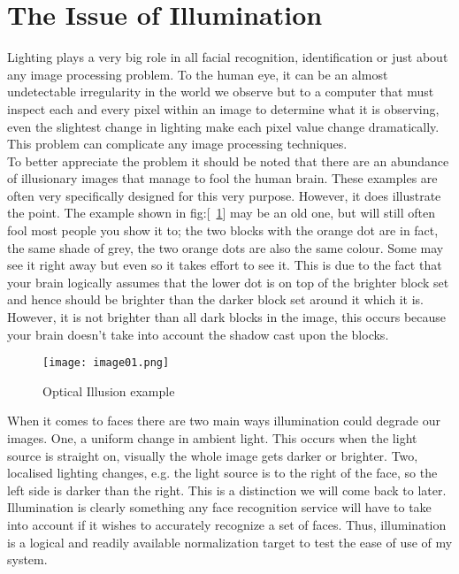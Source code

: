 \section{The Issue of Illumination}
Lighting plays a very big role in all facial recognition, identification or just about any image processing problem.  
To the human eye, it can be an almost undetectable irregularity in the world we observe but to a computer that must 
inspect each and every pixel within an image to determine what it is observing, even the slightest change in lighting 
make each pixel value change dramatically.  This problem can complicate any image processing techniques. \\

To better appreciate the problem it should be noted that there are an abundance of illusionary images that manage to 
fool the human brain.  These examples are often very specifically designed for this very purpose. However, it does
illustrate the point.  The example shown in fig:[~\ref{fig:OIE}] may be an old one, but will still often fool most people 
you show it to; the two blocks with the orange dot are in fact, the same shade of grey, the two orange dots are also 
the same colour.  Some may see it right away but even so it takes effort to see it.  This is due to the fact that your 
brain logically assumes that the lower dot is on top of the brighter block set and hence should be brighter than the 
darker block set around it which it is.  However, it is not brighter than all dark blocks in the image, this occurs 
because your brain doesn't take into account the shadow cast upon the blocks.	

	\begin{figure}[H]
		\centering
		\caption{Optical Illusion example\label{fig:OIE}}
		\texttt{[image: image01.png]}
	\end{figure}
	
When it comes to faces there are two main ways illumination could degrade our images.  One, a uniform change in ambient 
light.  This occurs when the light source is straight on, visually the whole image gets darker or brighter.  Two, 
localised lighting changes, e.g. the light source is to the right of the face, so the left side is darker than the right.  
This is a distinction we will come back to later.  Illumination is clearly something any face recognition service will 
have to take into account if it wishes to accurately recognize a set of faces.  Thus, illumination is a logical and 
readily available normalization target to test the ease of use of my system.

